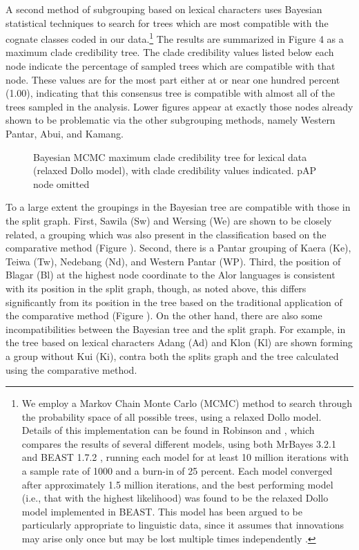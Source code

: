 A second method of subgrouping based on lexical characters uses Bayesian statistical techniques to search for trees which are most compatible with the cognate classes coded in our data.\footnote{ We employ a Markov Chain Monte Carlo (MCMC) method to search through the probability space of all possible trees, using a relaxed Dollo model. Details of this implementation can be found in Robinson and \citet{Holton2012}, which compares the results of  several different models, using both MrBayes 3.2.1  \citep{RonquistEtAl2003} and BEAST 1.7.2 \citep{DrummondEtAl2012}, running each model for at least 10 million iterations with a sample rate of 1000 and a burn-in of 25 percent. Each model converged after approximately 1.5 million iterations, and the best performing model (i.e., that with the highest likelihood) was found to be the relaxed Dollo model implemented in BEAST. This model has been argued to be particularly appropriate to linguistic data, since it assumes that
innovations may arise only once but may be lost multiple times independently \citep{Pagel2009}. } The results are summarized in Figure 4 as a maximum clade credibility tree. The clade credibility values listed below each node indicate the percentage of sampled trees which are compatible with that node. These values are for the most part either at or near one hundred percent (1.00), indicating that this consensus tree is compatible with almost all of the trees sampled in the analysis. Lower figures appear at exactly those nodes already shown to be problematic via the other subgrouping methods, namely Western Pantar, Abui, and Kamang.

\begin{figure}
\caption{Bayesian MCMC maximum clade credibility tree for lexical data (relaxed Dollo model), with clade credibility values indicated. pAP node omitted}
\label{bkm:Ref317516795}
\end{figure}

To a large extent the groupings in the Bayesian tree are compatible with those in the split graph. First, Sawila (Sw) and Wersing (We) are shown to be closely related, a grouping which was also present in the classification based on the comparative method (Figure ). Second, there is a Pantar grouping of Kaera (Ke), Teiwa (Tw), Nedebang (Nd), and Western Pantar (WP). Third, the position of Blagar (Bl) at the highest node coordinate to the Alor languages is consistent with its position in the split graph, though, as noted above, this differs significantly from its position in the tree based on the traditional application of the comparative method (Figure ). On the other hand, there are also some incompatibilities between the Bayesian tree and the split graph. For example, in the tree based on lexical characters Adang (Ad) and Klon (Kl) are shown forming a group without Kui (Ki), contra both the splits graph and the tree calculated using the comparative method.

